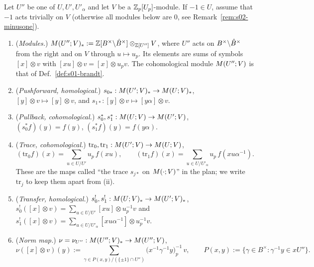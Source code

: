 \begin{definition}\label{def:s02-Mhom}
Let $U''$ be one of $U,U',U'_\alpha$ and let $V$ be a $\mathbb{Z}_p[U_p]$-module. If $-1\in U$, assume that $-1$ acts trivially on $V$
(otherwise all modules below are $0$, see Remark~\ref{rem:s02-minusone}).
\begin{enumerate}[label=(\roman*)]
\item (\emph{Modules.}) $M(U'';V)_*:=\mathbb{Z}[B^\times\backslash\hat{B}^\times]\otimes_{\mathbb{Z}[U'']}V$, where $U''$ acts on
  $B^\times\backslash\hat{B}^\times$ from the right and on $V$ through $u\mapsto u_p$. Its elements are sums of symbols
  $[x]\otimes v$ with $[xu]\otimes v=[x]\otimes u_pv$. The cohomological module $M(U'';V)$ is that of
  Def.~\ref{def:s01-brandt}.
\item (\emph{Pushforward, homological.}) $s_{0*}:M(U';V)_*\to M(U;V)_*$, $[y]\otimes v\mapsto[y]\otimes v$, and
  $s_{1*}:[y]\otimes v\mapsto[y\alpha]\otimes v$.
\item (\emph{Pullback, cohomological.}) $s_0^*,s_1^*:M(U;V)\to M(U';V)$, $(s_0^*f)(y)=f(y)$, $(s_1^*f)(y)=f(y\alpha)$.
\item (\emph{Trace, cohomological.}) $\mathrm{tr}_0,\mathrm{tr}_1:M(U';V)\to M(U;V)$,
  \[(\mathrm{tr}_0f)(x)=\sum_{u\in U/U'}u_p\,f(xu),\qquad(\mathrm{tr}_1f)(x)=\sum_{u\in U/U'_\alpha}u_p\,f(xu\alpha^{-1}).\]
  These are the maps called ``the trace $s_{j*}$ on $M(\cdot;V)$'' in the plan; we write $\mathrm{tr}_j$ to keep them apart
  from (ii).
\item (\emph{Transfer, homological.}) $s_0^!,s_1^!:M(U;V)_*\to M(U';V)_*$,
  $s_0^!([x]\otimes v)=\sum_{u\in U/U'}[xu]\otimes u_p^{-1}v$ and
  $s_1^!([x]\otimes v)=\sum_{u\in U/U'_\alpha}[xu\alpha^{-1}]\otimes u_p^{-1}v$.
\item (\emph{Norm map.}) $\nu=\nu_{U''}:M(U'';V)_*\to M(U'';V)$,
  \[\nu([x]\otimes v)(y):=\sum_{\gamma\in P(x,y)/(\{\pm1\}\cap U'')}\big(x^{-1}\gamma^{-1}y\big)_p^{-1}\,v,\qquad
    P(x,y):=\{\gamma\in B^\times:\gamma^{-1}y\in xU''\}.\]
\end{enumerate}
\end{definition}

